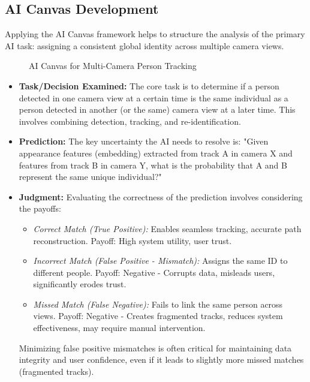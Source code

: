 \subsection{AI Canvas Development}
\label{subsection:ai_canvas_dev}
Applying the AI Canvas framework helps to structure the analysis of the primary AI task: assigning a consistent global identity across multiple camera views.
\begin{figure}[!htb] %
    \centering
    \caption{AI Canvas for Multi-Camera Person Tracking}
    \label{fig:ai_canvas}
\end{figure}
\begin{itemize}
    \item \textbf{Task/Decision Examined:} The core task is to determine if a person detected in one camera view at a certain time is the same individual as a person detected in another (or the same) camera view at a later time. This involves combining detection, tracking, and re-identification.
    \item \textbf{Prediction:} The key uncertainty the AI needs to resolve is: "Given appearance features (embedding) extracted from track A in camera X and features from track B in camera Y, what is the probability that A and B represent the same unique individual?"

    \item \textbf{Judgment:} Evaluating the correctness of the prediction involves considering the payoffs:
        \begin{itemize}
            \item \textit{Correct Match (True Positive):} Enables seamless tracking, accurate path reconstruction. Payoff: High system utility, user trust.
            \item \textit{Incorrect Match (False Positive - Mismatch):} Assigns the same ID to different people. Payoff: Negative - Corrupts data, misleads users, significantly erodes trust.
            \item \textit{Missed Match (False Negative):} Fails to link the same person across views. Payoff: Negative - Creates fragmented tracks, reduces system effectiveness, may require manual intervention.
        \end{itemize}
        Minimizing false positive mismatches is often critical for maintaining data integrity and user confidence, even if it leads to slightly more missed matches (fragmented tracks).


\end{itemize}
